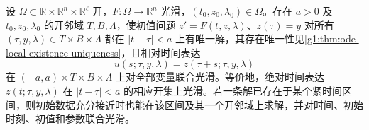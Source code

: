 \begin{theorem}
	\label{g1:thm:ode-smooth-dependence}
	设 \(\Omega\subset\mathbb R\times\mathbb R^n\times\mathbb R^\ell\) 开，\(F:\Omega\to\mathbb R^n\) 光滑，\((t_0,z_0,\lambda_0)\in\Omega\)。存在 \(a>0\) 及 \(t_0,z_0,\lambda_0\) 的开邻域 \(T,B,\Lambda\)，使初值问题 \(z'=F(t,z,\lambda)\)、\(z(\tau)=y\) 对所有 \((\tau,y,\lambda)\in T\times B\times\Lambda\) 都在 \(|t-\tau|<a\) 上有唯一解，其存在唯一性见\cref{g1:thm:ode-local-existence-uniqueness}，且相对时间表达
	\[
		u(s;\tau,y,\lambda)=z(\tau+s;\tau,y,\lambda)
	\]
	在 \((-a,a)\times T\times B\times\Lambda\) 上对全部变量联合光滑。等价地，绝对时间表达 \(z(t;\tau,y,\lambda)\) 在 \(|t-\tau|<a\) 的相应开集上光滑。若一条解已存在于某个紧时间区间，则初始数据充分接近时也能在该区间及其一个开邻域上求解，并对时间、初始时刻、初值和参数联合光滑。
\end{theorem}
